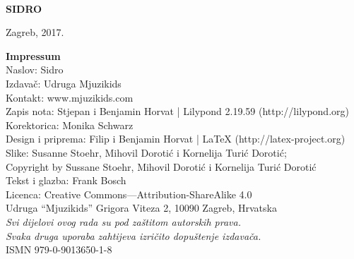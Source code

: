 \documentclass[a4paper,twoside, svgnames]{article}
\newcommand{\doccolor}{\color{red}}
\newcommand{\impresspac}{7pt}
\newcommand*{\titleTH}{\begingroup
\centering
\vspace*{5cm}
{\doccolor{\fontsize{60}{70}\selectfont \textrm{\bfseries PJESMARICA}}}\\[\baselineskip]
{\fontsize{113}{123}\selectfont \textsf{\textbf{SIDRO}}}\par
\vfill %
{Zagreb, 2017.}\par %
\endgroup}
\begin{document}
\thispagestyle {empty}
\titleTH

\newpage
\thispagestyle {empty}
\begin{center}
\vspace*{\fill}
\begin{onehalfspacing}
\textbf{\textsf{Impressum}}\\
\vspace{10pt}
Naslov: Sidro\\
\vspace{\impresspac}
Izdavač: Udruga Mjuzikids\\
\vspace{\impresspac}
Kontakt: www.mjuzikids.com\\
\vspace{\impresspac}
Zapis nota: Stjepan i Benjamin Horvat | Lilypond 2.19.59 (http://lilypond.org)\\
\vspace{\impresspac}
Korektorica: Monika Schwarz\\
\vspace{\impresspac}
Design i priprema: Filip i Benjamin Horvat | LaTeX (http://latex-project.org) \\
\vspace{\impresspac}
Slike: Susanne Stoehr, Mihovil Dorotić i Kornelija Turić Dorotić;\\
Copyright by Sussane Stoehr, Mihovil Dorotić i Kornelija Turić Dorotić\\
\vspace{\impresspac}
Tekst i glazba: Frank Bosch\\
\vspace{\impresspac}
Licenca: Creative Commons—Attribution-ShareAlike 4.0\\
\vspace{\impresspac}
Udruga “Mjuzikids” Grigora Viteza 2, 10090 Zagreb, Hrvatska\\
\vspace{\impresspac}
\textit{Svi dijelovi ovog rada su pod zaštitom autorskih prava.\\
Svaka druga uporaba zahtijeva izričito dopuštenje izdavača.}\\
\vspace{\impresspac}
ISMN 979-0-9013650-1-8\\

\end{onehalfspacing}
\end{center}
\end{document}
